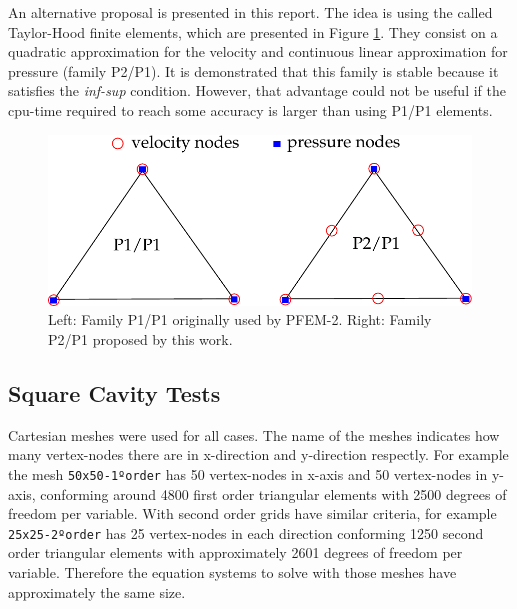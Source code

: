 \documentclass[a4paper,conference]{IEEEtran}
\begin{document}
An alternative proposal is presented in this report. The idea is using the called Taylor-Hood finite elements\cite{HoodTaylor73}, which are presented in Figure \ref{fg:taylor-hood}. They consist on a quadratic approximation for the velocity and continuous linear approximation for pressure (family P2/P1). It is demonstrated that this family is stable because it satisfies the \textit{inf-sup} condition. However, that advantage could not be useful if the cpu-time required to reach some accuracy is larger than using P1/P1 elements.

\begin{figure}[htbp]
  \begin{center}
      \includegraphics[width=.9\columnwidth]{images/taylor_hood.pdf}
  \end{center}
  \caption{\label{fg:taylor-hood} Left: Family P1/P1 originally used by PFEM-2. Right: Family P2/P1 proposed by this work.}
\end{figure}

\subsection{Square Cavity Tests}


Cartesian meshes were used for all cases. The name of the meshes indicates how many vertex-nodes there are in x-direction and y-direction respectly. For example the mesh \texttt{50x50-1ºorder} has 50 vertex-nodes in x-axis and 50 vertex-nodes in y-axis, conforming around 4800 first order triangular elements with 2500 degrees of freedom per variable. With second order grids have similar criteria, for example \texttt{25x25-2ºorder} has 25 vertex-nodes in each direction conforming 1250 second order triangular elements with approximately 2601 degrees of freedom per variable. Therefore the equation systems to solve with those meshes have approximately the same size.
\end{document}
